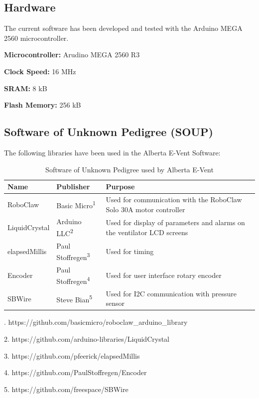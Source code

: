 \documentclass[]{article}
\begin{document}
\subsection{Hardware}
The current software has been developed and tested with the Arduino MEGA 2560 microcontroller.

\noindent \textbf{Microcontroller:} Arudino MEGA 2560 R3

\noindent \textbf{Clock Speed:} 16 MHz 

\noindent \textbf{SRAM:} 8 kB

\noindent \textbf{Flash Memory:} 256 kB




\subsection{Software of Unknown Pedigree (SOUP)}
\label{sect:soup}

The following libraries have been used in the Alberta E-Vent Software:

\begin{center}
	\begin{table}[h]
		\caption{Software of Unknown Pedigree used by Alberta E-Vent}
		\label{tab:sw_soup}
		\begin{tabular}{ |p{3cm}|p{3cm}|p{8cm}|}
			
			\hline
			\textbf{Name} & \textbf{Publisher} & \textbf{Purpose}  \\ \hline
			RoboClaw & Basic Micro\textsuperscript{1} & Used for communication with the RoboClaw Solo 30A motor controller \\ \hline
			LiquidCrystal & Arduino LLC\textsuperscript{2} & Used for display of parameters and alarms on the ventilator LCD screens\\ \hline
			elapsedMillis & Paul Stoffregen\textsuperscript{3} & Used for timing\\ \hline
			Encoder & Paul Stoffregen\textsuperscript{4} & Used for user interface rotary encoder\\ \hline
			SBWire & Steve Bian\textsuperscript{5} & Used for I2C communication with pressure sensor\\ \hline			
		\end{tabular}
	
	. https://github.com/basicmicro/roboclaw\_arduino\_library
	
	2. https://github.com/arduino-libraries/LiquidCrystal
	
	3. https://github.com/pfeerick/elapsedMillis
	
	4. https://github.com/PaulStoffregen/Encoder
	
	5. https://github.com/freespace/SBWire

\end{table}	
\end{center}
\end{document}
